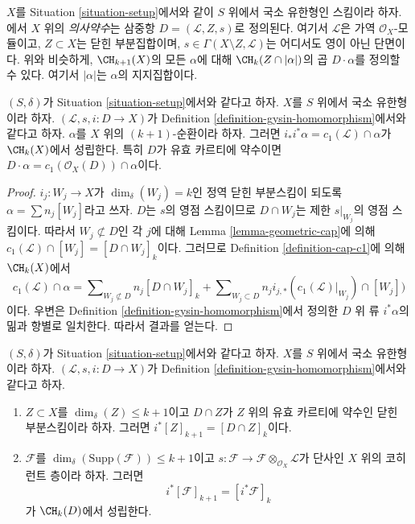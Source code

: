 \begin{remark}
\label{remark-generalize-to-pseudo-divisor}
$X$를 Situation \ref{situation-setup}에서와 같이 $S$ 위에서 국소 유한형인
스킴이라 하자. \cite{F}에서 $X$ 위의 {\it 의사약수}는 삼중항
$D = (\mathcal{L}, Z, s)$로 정의된다. 여기서 $\mathcal{L}$은 가역
$\mathcal{O}_X$-모듈이고, $Z \subset X$는 닫힌 부분집합이며,
$s \in \Gamma(X \setminus Z, \mathcal{L})$는 어디서도 영이 아닌
단면이다. 위와 비슷하게, $\CH_{k + 1}(X)$의 모든 $\alpha$에 대해
$\CH_k(Z \cap |\alpha|)$의 곱 $D \cdot \alpha$를 정의할 수 있다.
여기서 $|\alpha|$는 $\alpha$의 지지집합이다.
\end{remark}

\begin{lemma}
\label{lemma-support-cap-effective-Cartier}
$(S, \delta)$가 Situation \ref{situation-setup}에서와 같다고 하자.
$X$를 $S$ 위에서 국소 유한형이라 하자. $(\mathcal{L}, s, i : D \to X)$가
Definition \ref{definition-gysin-homomorphism}에서와 같다고 하자.
$\alpha$를 $X$ 위의 $(k + 1)$-순환이라 하자. 그러면
$i_*i^*\alpha = c_1(\mathcal{L}) \cap \alpha$가 $\CH_k(X)$에서 성립한다.
특히 $D$가 유효 카르티에 약수이면
$D \cdot \alpha = c_1(\mathcal{O}_X(D)) \cap \alpha$이다.
\end{lemma}

\begin{proof}
$i_j : W_j \to X$가 $\dim_\delta(W_j) = k$인 정역 닫힌 부분스킴이 되도록
$\alpha = \sum n_j[W_j]$라고 쓰자. $D$는 $s$의 영점 스킴이므로
$D \cap W_j$는 제한 $s|_{W_j}$의 영점 스킴이다. 따라서
$W_j \not \subset D$인 각 $j$에 대해 Lemma
\ref{lemma-geometric-cap}에 의해
$c_1(\mathcal{L}) \cap [W_j] = [D \cap W_j]_k$이다. 그러므로 Definition
\ref{definition-cap-c1}에 의해 $\CH_k(X)$에서
$$
c_1(\mathcal{L}) \cap \alpha
=
\sum\nolimits_{W_j \not \subset D} n_j[D \cap W_j]_k
+
\sum\nolimits_{W_j \subset D}
n_j i_{j, *}(c_1(\mathcal{L})|_{W_j}) \cap [W_j])
$$
이다. 우변은 Definition \ref{definition-gysin-homomorphism}에서 정의한
$D$ 위 류 $i^*\alpha$의 밂과 항별로 일치한다. 따라서 결과를 얻는다.
\end{proof}

\begin{lemma}
\label{lemma-easy-gysin}
$(S, \delta)$가 Situation \ref{situation-setup}에서와 같다고 하자.
$X$를 $S$ 위에서 국소 유한형이라 하자. $(\mathcal{L}, s, i : D \to X)$가
Definition \ref{definition-gysin-homomorphism}에서와 같다고 하자.
\begin{enumerate}
\item $Z \subset X$를 $\dim_\delta(Z) \leq k + 1$이고
$D \cap Z$가 $Z$ 위의 유효 카르티에 약수인 닫힌 부분스킴이라 하자.
그러면 $i^*[Z]_{k + 1} = [D \cap Z]_k$이다.
\item $\mathcal{F}$를 $\dim_\delta(\text{Supp}(\mathcal{F})) \leq k + 1$이고
$s : \mathcal{F} \to \mathcal{F} \otimes_{\mathcal{O}_X} \mathcal{L}$가
단사인 $X$ 위의 코히런트 층이라 하자. 그러면
$$
i^*[\mathcal{F}]_{k + 1} = [i^*\mathcal{F}]_k
$$
가 $\CH_k(D)$에서 성립한다.
\end{enumerate}
\end{lemma}

